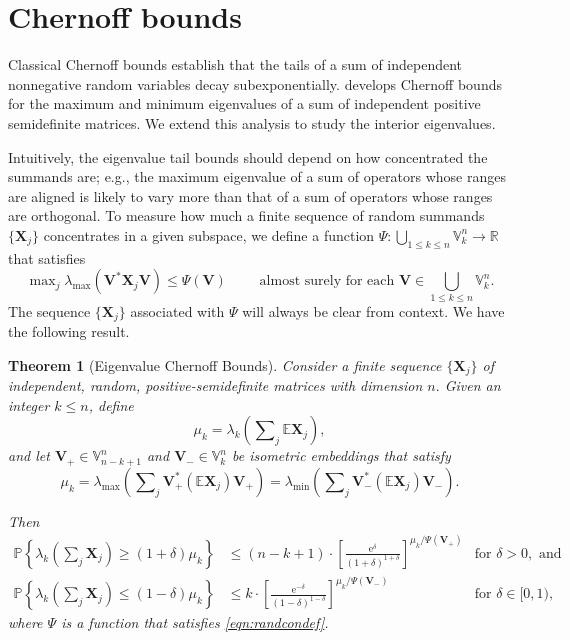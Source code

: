 \documentclass[11pt,letterpaper,twoside,reqno,nosumlimits]{amsart}
\renewcommand{\star}{*}
\newcommand{\mat}[1]{\ensuremath{\bm{#1}}} %
\newcommand{\e}{\ensuremath{\mathrm{e}}}
\newcommand{\E}{\ensuremath{\mathbb{E}}}
\newcommand{\Prob}[1]{\ensuremath{\mathbb{P}\left\{#1\right\}}}
\newcommand{\R}{\ensuremath{\mathbb{R}}}
\newcommand{\randcon}{\ensuremath{\Psi}}
\newcommand{\lambdamax}[1]{\ensuremath{\lambda_{\mathrm{max}}\left(#1\right)}}
\newcommand{\lambdamin}[1]{\ensuremath{\lambda_{\mathrm{min}}\left(#1\right)}}
\newcommand{\Isom}[2]{\ensuremath{\mathbb{V}_{#1}^{#2}}}
\newtheorem{thm}{Theorem}
\theoremstyle{remark}
\numberwithin{equation}{section}
\numberwithin{thm}{section}
\numberwithin{prop}{section}
\numberwithin{defn}{section}
\numberwithin{remark}{section}
\begin{document}
\section{ Chernoff bounds}
\label{sec:chernoffbounds}

Classical Chernoff bounds establish that the tails of a sum of independent nonnegative random variables decay subexponentially. \cite{T10a} develops Chernoff bounds for the maximum and minimum eigenvalues of a sum of independent positive semidefinite matrices. We extend this analysis to study the interior eigenvalues. 

Intuitively, the eigenvalue tail bounds should depend on how concentrated the summands are; e.g., the maximum eigenvalue of a sum of operators whose ranges are aligned is likely to vary more than that of a sum of operators whose ranges are orthogonal. To measure how much a finite sequence of random summands $\{\mat{X}_j\}$ concentrates in a given subspace, we define a function $\randcon : \bigcup_{1 \leq k \leq n} \Isom{k}{n} \rightarrow \R$ that satisfies
\begin{equation}
	\max\nolimits_j \lambdamax{\mat{V}^\star \mat{X}_j \mat{V}} \leq \randcon(\mat{V}) \qquad \text{ almost surely for each } \mat{V} \in \bigcup_{1 \leq k \leq n} \Isom{k}{n}. 
\label{eqn:randcondef}
\end{equation}
The sequence $\{\mat{X}_j\}$ associated with $\randcon$ will always be clear from context. We have the following result.
\begin{thm}[Eigenvalue Chernoff Bounds]
Consider a finite sequence $\{\mat{X}_j\}$ of independent, random, positive-semidefinite matrices with dimension $n.$ Given an integer $k \leq n$, define 
\[
\mu_k = \lambda_k\left(\sum\nolimits_j \E \mat{X}_j\right),
\]
and let $\mat{V}_{+} \in \Isom{n-k+1}{n}$ and $\mat{V}_{-} \in \Isom{k}{n}$ be isometric embeddings that satisfy 
 $$ \mu_k = \lambdamax{\sum\nolimits_j \mat{V}_{+}^\star (\E \mat{X}_j)\mat{V}_{+}} = \lambdamin{\sum\nolimits_j \mat{V}_{-}^\star (\E \mat{X}_j)\mat{V}_{-}}. $$

Then 
\begin{align*}
\Prob{\lambda_k\left( \sum\nolimits_j \mat{X}_j \right) \geq (1+\delta)\mu_k} & \leq (n-k+1) \cdot \left[\frac{\e^\delta}{(1+\delta)^{1+\delta}} \right]^{\mu_k/\randcon(\mat{V}_{+})} 
 & \text{for } \delta > 0, \text{ and} \\ 
\Prob{\lambda_k\left(\sum\nolimits_j \mat{X}_j \right) \leq (1-\delta)\mu_k} & \leq k \cdot \left[\frac{\e^{-\delta}}{(1-\delta)^{1-\delta}}\right]^{\mu_k/\randcon(\mat{V}_{-})} &  \text{for } \delta \in [0,1),
\end{align*}
where $\randcon$ is a function that satisfies \eqref{eqn:randcondef}.
\label{thm:chernoff}
\end{thm}
\end{document}
